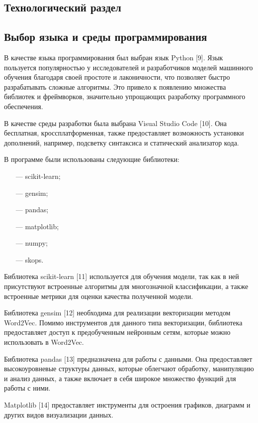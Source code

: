 \documentclass[a4paper, 12pt]{article}
\begin{document}
\begin{large}
\pagebreak

\newpage

\section{Технологический раздел}
\subsection{Выбор языка и среды программирования}
В качестве языка программирования был выбран язык Python [9]. 
Язык пользуется популярностью у исследователей и разработчиков моделей машинного обучения благодаря своей простоте и лаконичности, что позволяет быстро разрабатывать сложные алгоритмы. 
Это привело к появлению множества библиотек и фреймворков, значительно упрощающих разработку программного обеспечения.

В качестве среды разработки была выбрана Visual Studio Code [10]. 
Она бесплатная, кроссплатформенная, также предоставляет возможность установки дополнений, например, подсветку синтаксиса и статический анализатор кода.

В программе были использованы следующие библиотеки:
\begin{itemize}
    \item[---] scikit-learn;
    \item[---] gensim;
    \item[---] pandas;
    \item[---] matplotlib;
    \item[---] numpy;
    \item[---] skops.
\end{itemize}
Библиотека scikit-learn [11] используется для обучения модели, так как в ней присутствуют встроенные алгоритмы для многозначной классификации, а также встроенные метрики для оценки качества полученной модели.

Библиотека gensim [12] необходима для реализации векторизации методом Word2Vec. 
Помимо инструментов для данного типа векторизации, библиотека предоставляет доступ к предобученным нейронным сетям, которые можно использовать в Word2Vec.

Библиотека pandas [13] предназначена для работы с данными. 
Она предоставляет высокоуровневые структуры данных, которые облегчают обработку, манипуляцию и анализ данных, а также включает в себя широкое множество функций для работы с ними.

Matplotlib [14] предоставляет инструменты для остроения графиков, диаграмм и других видов визуализации данных.


\end{large}
\end{document}
